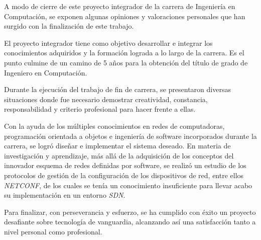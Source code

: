 A modo de cierre de este proyecto integrador de la carrera de Ingeniería en Computación, se exponen algunas opiniones y valoraciones personales que han surgido con la finalización de este trabajo.

El proyecto integrador tiene como objetivo desarrollar e integrar los conocimientos adquiridos y la formación lograda a lo largo de la carrera. Es el punto culmine de un camino de 5 años para la obtención del título de grado de Ingeniero en Computación.

Durante la ejecución del trabajo de fin de carrera, se presentaron diversas situaciones donde fue necesario demostrar creatividad, constancia, responsabilidad y criterio profesional para hacer frente a ellas.   

Con la ayuda de los múltiples conocimientos en redes de computadoras, programación orientada a objetos e ingeniería de software incorporados durante la carrera, se logró diseñar e implementar el sistema deseado. En materia de investigación y aprendizaje, más allá de la adquisición de los conceptos del innovador esquema de redes definidas por software, se realizó un estudio de los protocolos de gestión de la configuración de los dispositivos de red, entre ellos \textit{NETCONF}, de los cuales se tenía un conocimiento insuficiente para llevar acabo su implementación en un entorno \textit{SDN}.

Para finalizar, con perseverancia y esfuerzo, se ha cumplido con éxito un proyecto desafiante sobre tecnología de vanguardia, alcanzando así una satisfacción tanto a nivel personal como profesional. 